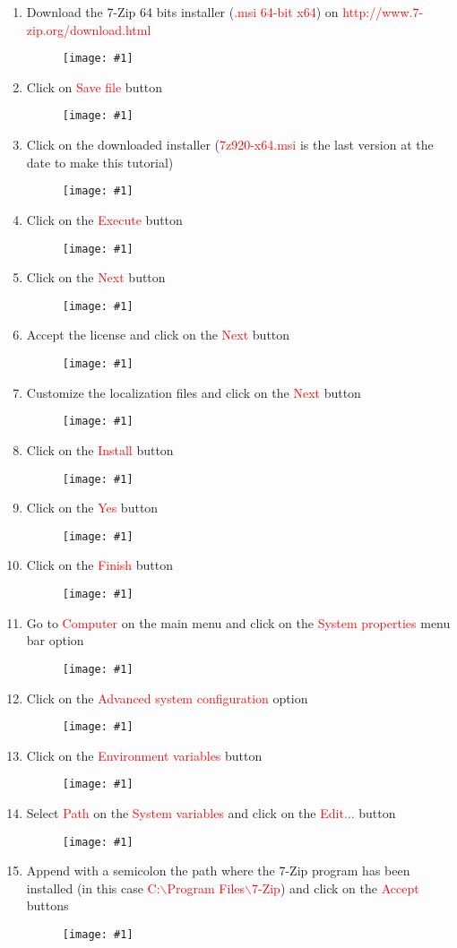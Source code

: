 \documentclass[a4paper]{article}
\newcommand{\FIGURE}[1]
{
	\begin{figure}[!ht]
	\centering
	\texttt{[image: \#1]}
	\end{figure}
}
\newcommand{\RED}[1] {\textcolor{red}{#1}}
\begin{document}
\begin{enumerate}

\item Download the 7-Zip 64 bits installer (\RED{.msi 64-bit x64}) on \newline
\RED{http://www.7-zip.org/download.html}

\FIGURE{7zip.png.eps}

\clearpage

\item Click on \RED{Save file} button
\FIGURE{7zip-2.png.eps}

\item Click on the downloaded installer (\RED{7z920-x64.msi} is the last version
at the date to make this tutorial)

\FIGURE{7zip-3.png.eps}

\clearpage

\item Click on the \RED{Execute} button
\FIGURE{7zip-4.png.eps}

\item Click on the \RED{Next} button
\FIGURE{7zip-5.png.eps}

\clearpage

\item Accept the license and click on the \RED{Next} button
\FIGURE{7zip-6.png.eps}

\item Customize the localization files and click on the \RED{Next} button
\FIGURE{7zip-7.png.eps}

\clearpage

\item Click on the \RED{Install} button
\FIGURE{7zip-8.png.eps}

\item Click on the \RED{Yes} button
\FIGURE{7zip-9.png.eps}

\clearpage

\item Click on the \RED{Finish} button
\FIGURE{7zip-10.png.eps}

\item Go to \RED{Computer} on the main menu and click on the
\RED{System properties} menu bar option
\FIGURE{7zip-11.png.eps}

\clearpage

\item Click on the \RED{Advanced system configuration} option
\FIGURE{7zip-12.png.eps}

\item Click on the \RED{Environment variables} button
\FIGURE{7zip-13.png.eps}

\clearpage

\item Select \RED{Path} on the \RED{System variables} and click on the
\RED{Edit...} button
\FIGURE{7zip-14.png.eps}

\item Append with a semicolon the path where the 7-Zip program has been
installed (in this case \RED{C:$\backslash$Program Files$\backslash$7-Zip}) and
click on the \RED{Accept} buttons
\FIGURE{7zip-15.png.eps}

\end{enumerate}
\end{document}

